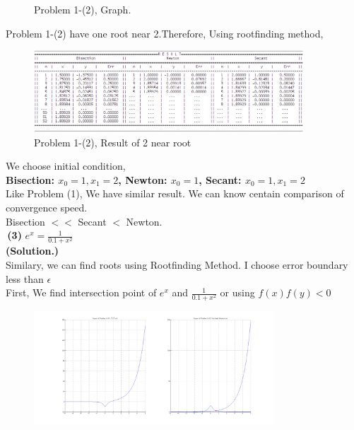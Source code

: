 \documentclass[10pt]{article}
\begin{document}
\begin{flushleft}
\begin{figure}[!h]
\begin{center}
		\caption{Problem 1-(2), Graph.}
		\end{center}
	\end{figure}
	\qquad \quad Problem 1-(2) have one root near 2.Therefore, Using rootfinding method,\\
	\begin{figure}[!h]
		\centering
		\begin{center}
		\includegraphics[width=0.9\textwidth]{1-2-r.png}
		\caption{Problem 1-(2), Result of 2 near root }
		\end{center}
	\end{figure}
	\qquad \quad We choose initial condition,\\
	\qquad \qquad \qquad \qquad \qquad \textbf{Bisection: $x_0=1,x_1=2$, Newton: $x_0=1$, Secant: $x_0=1,x_1=2$}\\
	\qquad \quad Like Problem (1), We have similar result. We can know centain comparison of convergence speed. \\
	\qquad \qquad \qquad \qquad \qquad\qquad\qquad\qquad\qquad   Bisection $<<$ Secant $ < $ Newton.\\
	\;\;\;\;
	\quad\,\textbf{(3)} $e^x=\frac{1}{0.1+x^2}$\\
	\;\;\;
	\qquad \quad \textbf{(Solution.)} \\
	\qquad \quad Similary, we can find roots using Rootfinding Method. I choose error boundary less than $\epsilon$\\ 
	\qquad \quad First, We find intersection point of $e^x$ and $\frac{1}{0.1+x^2}$ or using $f(x)f(y)<0$\\
	\begin{figure}[!h]
		\centering
		\begin{center}
		\includegraphics[width=0.8\textwidth]{1-1-3.png}

\end{center}
\end{figure}
\end{flushleft}
\end{document}
